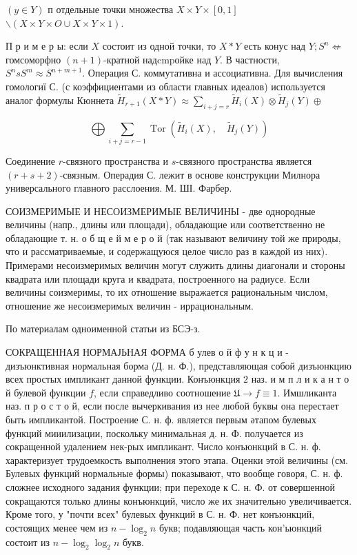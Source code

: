 \documentclass[10pt]{article}
\begin{document}
$(y \in Y)$ п отдельные точки множества $X \times Y \times[0,1]$ $\backslash(X \times Y \times O \cup X \times Y \times 1)$.



П р и м е р ы: если $X$ состоит из одной точки, то $X * Y$ есть конус над $Y ; S^{n} \nLeftarrow$ гомсоморфно $(n+1)$-кратной надcmpойке над $Y$. В частности, $S^{n} s S^{m} \approx S^{n+m+1}$. Операция С. коммутативна и ассоциативна. Для вычисления гомологиї С. (с коэффициентами из области главных идеалов) используется аналог формулы Кюннета $\tilde{H}_{r+1}(X * Y) \approx \sum_{i+j=r} \tilde{H}_{i}(X) \otimes \tilde{H}_{j}(Y) \oplus$



\[

\bigoplus \sum_{i+j=r-1} \operatorname{Tor}\left(\tilde{H}_{i}(X), \quad \tilde{H}_{j}(Y)\right)

\]



Соединение $r$-связного пространства и $s$-связного пространства является $(r+s+2)$-связным. Операдия С. лежит в основе конструкции Милнора универсального главного расслоения. М. ШІ. Фарбер.



СОИЗМЕРИМЫЕ И НЕСОИЗМЕРИМЫЕ ВЕЛИЧИНЫ - две однородные величины (напр., длины или площади), обладающие или соответственно не обладающие т. н. о б щ е й м е р о й (так называют величину той же природы, что и рассматриваемые, и содержащуюся целое число раз в каждой из них). Примерами несоизмеримых величин могут служить длины диагонали и стороны квадрата или площади круга и квадрата, построенного на радиусе. Если величины соизмеримы, то их отношение выражается рациональным числом, отношение же несоизмеримых величин - иррациональным.



По материалам одноименной статьи из БСЭ-з.



СОКРАЩЕННАЯ НОРМАЈЬНАЯ ФОРМА б улев о й ф у н к ц и - дизъюнктивная нормальная борма (Д. н. Ф.), представляющая собой дизъюнкцию всех простых импликант данной функции. Конъюнкция $\mathfrak{2}$ наз. и м п л и к а н т о й булевой функции $f$, если справедливо соотношение $\mathfrak{U} \rightarrow f \equiv 1$. Имшликанта наз. п р о с т о й, если после вычеркивания из нее любой буквы она перестает быть импликантой. Построение С. н. ф. является первым әтапом булевых функций мииилизации, поскольку минимальная д. н. Ф. получается из сокращенной удалением нек-рых импликант. Число конъюнкций в С. н. ф. характеризует трудоемкость выполнения этого этапа. Оценки этой величины (см. Булевых функций нормальные формы) показывают, что вообще говоря, С. н. ф. сложнее исходного задания функции; при переходе к С. н. Ф. от совершенной сокращаются только длины конъюнкций, число же их значительно увеличивается. Кроме того, у "почти всех" булевых функций в С. н. Ф. нет конъюнкций, состоящих менее чем из $n-\log _{2} n$ букв; подавляющая часть кон'ьюнкций состоит из $n-\log _{2} \log _{2} n$ букв.
\end{document}
